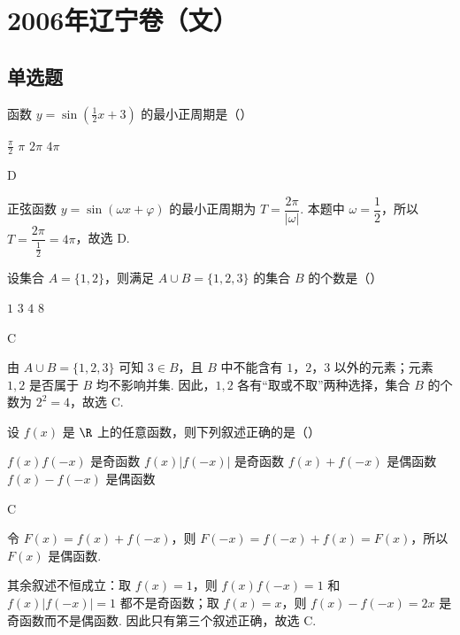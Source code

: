 \chapter{2006年辽宁卷（文）}
\section{单选题}
\begin{problem}
函数 \( y = \sin \left(\frac{1}{2} x + 3\right) \) 的最小正周期是（\quad）

\choices
    {\( \frac{\pi}{2} \)}
    {\(\pi\)}
    {\(2\pi\)}
    {\(4\pi\)}
\end{problem}

\begin{answer}
D
\end{answer}

\begin{solution}
正弦函数 \(y=\sin(\omega x+\varphi)\) 的最小正周期为 \(T=\dfrac{2\pi}{|\omega|}\). 本题中 \(\omega=\dfrac{1}{2}\)，所以 \(T=\dfrac{2\pi}{\frac{1}{2}}=4\pi\)，故选 D.
\end{solution}

\begin{problem}
设集合 \(A = \{1, 2\}\)，则满足 \(A \cup B = \{1, 2, 3\}\) 的集合 \(B\) 的个数是（\quad）

\choices
    {\(1\)}
    {\(3\)}
    {\(4\)}
    {\(8\)}
\end{problem}

\begin{answer}
C
\end{answer}

\begin{solution}
由 \(A\cup B=\{1,2,3\}\) 可知 \(3\in B\)，且 \(B\) 中不能含有 \(1\)，\(2\)，\(3\) 以外的元素；元素 \(1,2\) 是否属于 \(B\) 均不影响并集. 因此，\(1,2\) 各有“取或不取”两种选择，集合 \(B\) 的个数为 \(2^2=4\)，故选 C.
\end{solution}

\begin{problem}
设 \( f(x) \) 是 \( \R \) 上的任意函数，则下列叙述正确的是（\quad）

\choices
    {\(f(x)f(-x)\) 是奇函数}
    {\(f(x)|f(-x)|\) 是奇函数}
    {\(f(x) + f(-x)\) 是偶函数}
    {\(f(x) - f(-x)\) 是偶函数}
\end{problem}

\begin{answer}
C
\end{answer}

\begin{solution}
令 \(F(x)=f(x)+f(-x)\)，则 \(F(-x)=f(-x)+f(x)=F(x)\)，所以 \(F(x)\) 是偶函数.

其余叙述不恒成立：取 \(f(x)=1\)，则 \(f(x)f(-x)=1\) 和 \(f(x)|f(-x)|=1\) 都不是奇函数；取 \(f(x)=x\)，则 \(f(x)-f(-x)=2x\) 是奇函数而不是偶函数. 因此只有第三个叙述正确，故选 C.
\end{solution}

